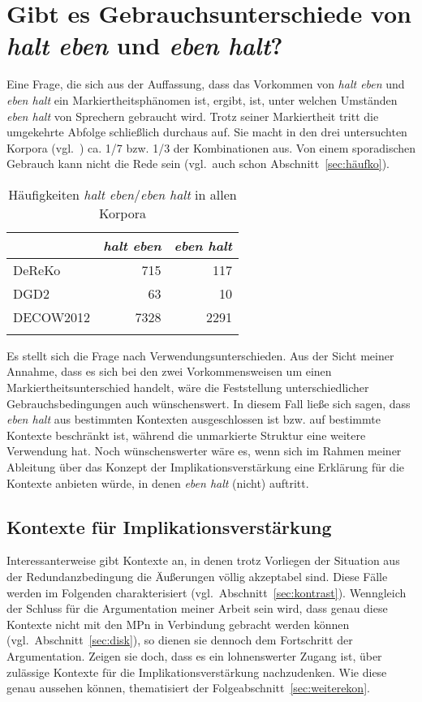 \section{Gibt es Gebrauchsunterschiede von \textit{halt eben} und \textit{eben halt}?}
\label{sec:gebrauchheeh}
Eine Frage, die sich aus der Auffassung, dass das Vorkommen von \textit{halt eben} und \textit{eben halt} ein Markiertheitsphänomen ist, ergibt, ist, unter welchen Umständen \textit{eben halt} von Sprechern gebraucht wird. Trotz seiner Markiertheit tritt die umgekehrte Abfolge schließlich durchaus auf. Sie macht in den drei untersuchten Korpora (vgl.\ ) ca. 1/7 bzw. 1/3 der Kombinationen aus. Von einem spora\-dischen Gebrauch kann nicht die Rede sein (vgl.\ auch schon Abschnitt~\ref{sec:häufko}). 

\begin{table}
	\caption{\label{tab:693}Häufigkeiten \textit{halt eben}/\textit{eben halt} in allen Korpora}
	\begin{tabular}{lrr}
	\lsptoprule
	{} & \textit{halt eben} & \textit{eben halt}\\
	\midrule
	DeReKo & 715 & 117\\
	DGD2 & 63 & 10\\
	DECOW2012 & 7328 & 2291\\
	\lspbottomrule
    \end{tabular}
\end{table}
Es stellt sich die Frage nach Verwendungsunterschieden. Aus der Sicht meiner Annahme, dass es sich bei den zwei Vorkommensweisen um einen Markiertheits\-unterschied handelt, wäre die Feststellung unterschiedlicher Gebrauchsbedingungen auch wünschenswert. In diesem Fall ließe sich sagen, dass \textit{eben halt} aus bestimmten Kontexten ausgeschlossen ist bzw. auf bestimmte Kontexte beschränkt ist, während die unmarkierte Struktur eine weitere Verwendung hat. Noch wünschenswerter wäre es, wenn sich im Rahmen meiner Ableitung über das Konzept der Implikationsverstärkung eine Erklärung für die Kontexte anbieten würde, in denen \textit{eben halt} (nicht) auftritt.

\subsection{Kontexte für Implikationsverstärkung}
Interessanterweise gibt \citet{Horn1991} Kontexte an, in denen trotz Vorliegen der Situation aus der Redundanzbedingung die Äußerungen völlig akzeptabel sind. Diese Fälle werden im Folgenden charakterisiert (vgl.\ Abschnitt~\ref{sec:kontrast}). Wenn\-gleich der Schluss für die Argumentation meiner Arbeit sein wird, dass genau diese Kontexte nicht mit den MPn in Verbindung gebracht werden können (vgl.\ Abschnitt~\ref{sec:disk}), so dienen sie dennoch dem Fortschritt der Argumentation. Zeigen sie doch, dass es ein lohnenswerter Zugang ist, über zulässige Kontexte für die Implikationsverstärkung nachzudenken. Wie diese genau aussehen können, thematisiert der Folgeabschnitt~\ref{sec:weiterekon}.

